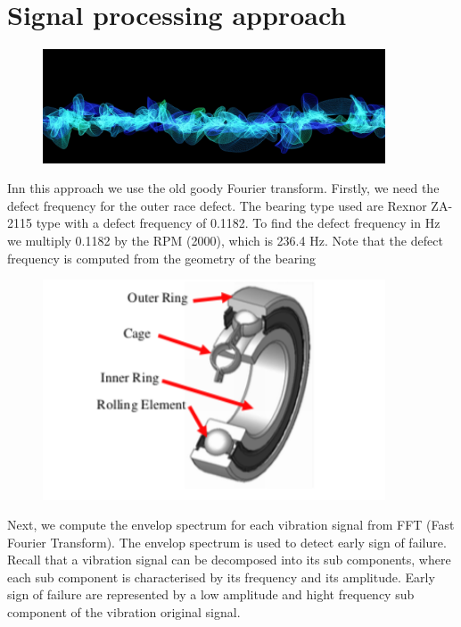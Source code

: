 \documentclass[11pt, oneside]{article}   	%
\begin{document}
\section{Signal processing approach}
\begin{figure}[H] %
   \centering
   \includegraphics[width=4in]{vibration} 
   \caption{}
   \label{fig:example}
\end{figure}
Inn this approach we use the old goody Fourier transform. Firstly, we need the defect frequency for the outer race defect. The bearing type used are Rexnor ZA-2115 type with a defect frequency of 0.1182. To find the defect frequency in Hz we multiply 0.1182 by the RPM (2000), which is 236.4 Hz. Note that the defect frequency is computed from the geometry of the bearing 
\begin{figure}[htbp] %
   \centering
   \includegraphics[width=4in]{bearing.png} 
   \caption{}
   \label{fig:example}
\end{figure}
\begin{flushleft}
Next, we compute the envelop spectrum for each vibration signal from FFT (Fast Fourier Transform). The envelop spectrum is used to detect early sign of failure. Recall that a vibration signal can be decomposed into its sub components, where each  sub component 
is characterised by its frequency and its amplitude. Early sign of failure are represented by a low amplitude and hight frequency sub component of the vibration original signal.
\end{flushleft}
\end{document}
